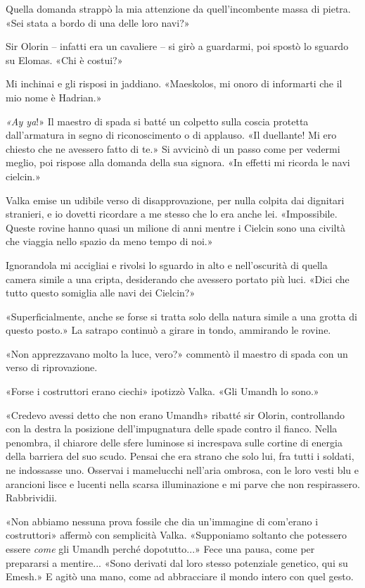 Quella domanda strappò la mia attenzione da quell'incombente massa di
pietra. «Sei stata a bordo di una delle loro navi?»

Sir Olorin -- infatti era un cavaliere -- si girò a guardarmi, poi
spostò lo sguardo su Elomas. «Chi è costui?»

Mi inchinai e gli risposi in jaddiano. «Maeskolos, mi onoro di
informarti che il mio nome è Hadrian.»

\emph{«Ay ya}!» Il maestro di spada si batté un colpetto sulla coscia
protetta dall'armatura in segno di riconoscimento o di applauso. «Il
duellante! Mi ero chiesto che ne avessero fatto di te.» Si avvicinò di
un passo come per vedermi meglio, poi rispose alla domanda della sua
signora. «In effetti mi ricorda le navi cielcin.»

Valka emise un udibile verso di disapprovazione, per nulla colpita dai
dignitari stranieri, e io dovetti ricordare a me stesso che lo era anche
lei. «Impossibile. Queste rovine hanno quasi un milione di anni mentre i
Cielcin sono una civiltà che viaggia nello spazio da meno tempo di noi.»

Ignorandola mi accigliai e rivolsi lo sguardo in alto e nell'oscurità di
quella camera simile a una cripta, desiderando che avessero portato più
luci. «Dici che tutto questo somiglia alle navi dei Cielcin?»

«Superficialmente, anche se forse si tratta solo della natura simile a
una grotta di questo posto.» La satrapo continuò a girare in tondo,
ammirando le rovine.

«Non apprezzavano molto la luce, vero?» commentò il maestro di spada con
un verso di riprovazione.

«Forse i costruttori erano ciechi» ipotizzò Valka. «Gli Umandh lo sono.»

«Credevo avessi detto che non erano Umandh» ribatté sir Olorin,
controllando con la destra la posizione dell'impugnatura delle spade
contro il fianco. Nella penombra, il chiarore delle sfere luminose si
increspava sulle cortine di energia della barriera del suo scudo. Pensai
che era strano che solo lui, fra tutti i soldati, ne indossasse uno.
Osservai i mamelucchi nell'aria ombrosa, con le loro vesti blu e
arancioni lisce e lucenti nella scarsa illuminazione e mi parve che non
respirassero. Rabbrividii.

«Non abbiamo nessuna prova fossile che dia un'immagine di com'erano i
costruttori» affermò con semplicità Valka. «Supponiamo soltanto che
potessero essere \emph{come} gli Umandh perché dopotutto...» Fece una
pausa, come per prepararsi a mentire... «Sono derivati dal loro stesso
potenziale genetico, qui su Emesh.» E agitò una mano, come ad
abbracciare il mondo intero con quel gesto.

